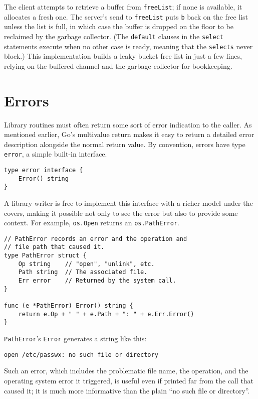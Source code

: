 The client attempts to retrieve a buffer from \texttt{freeList}; if none
is available, it allocates a fresh one. The server's send to
\texttt{freeList} puts \texttt{b} back on the free list unless the list
is full, in which case the buffer is dropped on the floor to be
reclaimed by the garbage collector. (The \texttt{default} clauses in the
\texttt{select} statements execute when no other case is ready, meaning
that the \texttt{selects} never block.) This implementation builds a
leaky bucket free list in just a few lines, relying on the buffered
channel and the garbage collector for bookkeeping.

\section*{Errors}

Library routines must often return some sort of error indication to the
caller. As mentioned earlier, Go's multivalue return makes it easy to
return a detailed error description alongside the normal return value.
By convention, errors have type \texttt{error}, a simple built-in
interface.

\begin{Verbatim}[frame=single]
type error interface {
    Error() string
}
\end{Verbatim}

A library writer is free to implement this interface with a richer model
under the covers, making it possible not only to see the error but also
to provide some context. For example, \texttt{os.Open} returns an
\texttt{os.PathError}.

\begin{Verbatim}[frame=single]
// PathError records an error and the operation and
// file path that caused it.
type PathError struct {
    Op string    // "open", "unlink", etc.
    Path string  // The associated file.
    Err error    // Returned by the system call.
}

func (e *PathError) Error() string {
    return e.Op + " " + e.Path + ": " + e.Err.Error()
}
\end{Verbatim}

\texttt{PathError}'s \texttt{Error} generates a string like this:

\begin{Verbatim}[frame=single]
open /etc/passwx: no such file or directory
\end{Verbatim}

Such an error, which includes the problematic file name, the operation,
and the operating system error it triggered, is useful even if printed
far from the call that caused it; it is much more informative than the
plain ``no such file or directory''.

